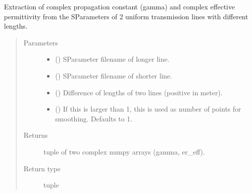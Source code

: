 \documentclass[letterpaper,10pt,english]{sphinxmanual}
\begin{document}
\begin{fulllineitems}
\label{\detokenize{touchstone:touchstone.extract_gamma_ereff}}
Extraction of complex propagation constant (gamma) and complex effective permittivity from the S\sphinxhyphen{}Parameters of 2 uniform transmission lines with different lengths.
\begin{quote}\begin{description}
\item[{Parameters}] \leavevmode\begin{itemize}
\item {} 
 () \textendash{} S\sphinxhyphen{}Parameter filename of longer line.

\item {} 
 () \textendash{} S\sphinxhyphen{}Parameter filename of shorter line.

\item {} 
 () \textendash{} Difference of lengths of two lines (positive in meter).

\item {} 
 (\sphinxstyleliteralemphasis{\sphinxupquote{, }}) \textendash{} If this is larger than 1, this is used as number of points for smoothing. Defaults to 1.

\end{itemize}

\item[{Returns}] \leavevmode
tuple of two complex numpy arrays (gamma, er\_eff).

\item[{Return type}] \leavevmode
tuple

\end{description}\end{quote}

\end{fulllineitems}
\end{document}
